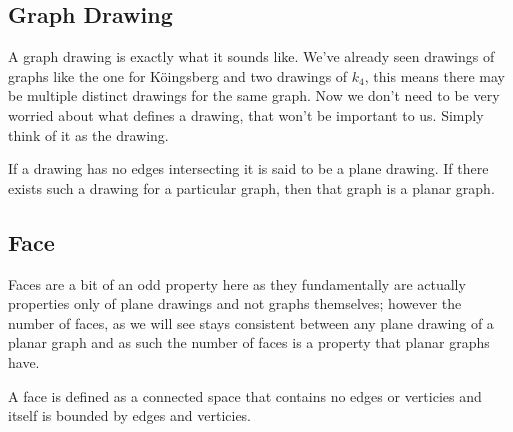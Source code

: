 \documentclass{article}
\begin{document}
\subsection{Graph Drawing}
A graph drawing is exactly what it sounds like. We've already seen drawings of graphs like the one for K\"oingsberg and two drawings of $k_4$, this means there may be multiple distinct drawings for the same graph. Now we don't need to be very worried about what defines a drawing, that won't be important to us. Simply think of it as the drawing.

If a drawing has no edges intersecting it is said to be a plane drawing. If there exists such a drawing for a particular graph, then that graph is a planar graph.

\subsection{Face}
Faces are a bit of an odd property here as they fundamentally are actually properties only of plane drawings and not graphs themselves; however the number of faces, as we will see stays consistent between any plane drawing of a planar graph and as such the number of faces is a property that planar graphs have.

A face is defined as a connected space that contains no edges or verticies and itself is bounded by edges and verticies.
\end{document}
